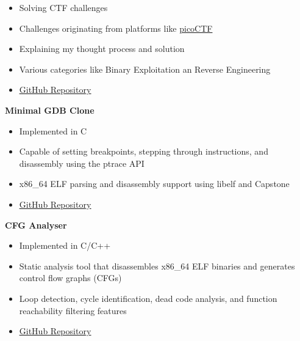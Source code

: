 \documentclass[12pt]{article}
\begin{document}
{\renewcommand{\labelitemi}{\textcolor{bgcolor}{\normalsize$\bullet$}}%
   \begin{itemize}[leftmargin=33pt, itemsep=0pt, topsep=0pt]
      \item Solving CTF challenges\\
      \item Challenges originating from platforms like \href{https://picoctf.org/}{picoCTF}\\
      \item Explaining my thought process and solution\\
      \item Various categories like Binary Exploitation an Reverse Engineering\\
      \item \href{https://github.com/gpaphitis/CTF-Writeups}{\underline{GitHub Repository}}\\
   \end{itemize}
}
\vspace{0.5cm}
\textbf{\textcolor{bgcolor}{Minimal GDB Clone}}\\[0.5em]
{\renewcommand{\labelitemi}{\textcolor{bgcolor}{\normalsize$\bullet$}}%
   \begin{itemize}[leftmargin=33pt, itemsep=0pt, topsep=0pt]
      \item Implemented in C\\
      \item Capable of setting breakpoints, stepping through instructions, and disassembly using the ptrace API\\
      \item x86\_64 ELF parsing and disassembly support using libelf and Capstone\\
      \item \href{https://github.com/gpaphitis/MinimalGDB}{\underline{GitHub Repository}}\\
   \end{itemize}
}
\vspace{0.5cm}
\textbf{\textcolor{bgcolor}{CFG Analyser}}\\[0.5em]
{\renewcommand{\labelitemi}{\textcolor{bgcolor}{\normalsize$\bullet$}}%
   \begin{itemize}[leftmargin=33pt, itemsep=0pt, topsep=0pt]
      \item Implemented in C/C++\\
      \item Static analysis tool that disassembles x86\_64 ELF binaries and generates control flow graphs (CFGs)\\
      \item Loop detection, cycle identification, dead code analysis, and function reachability filtering features\\
      \item \href{https://github.com/gpaphitis/CFGAnalyzer}{\underline{GitHub Repository}}\\
   \end{itemize}
}
\end{document}
